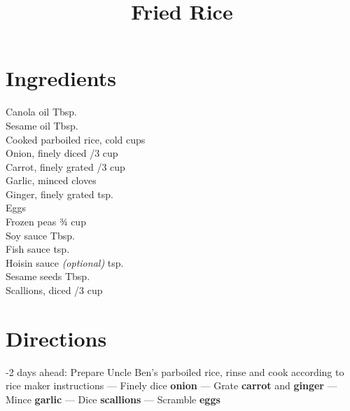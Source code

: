 \documentclass[11pt,letterpaper]{article}
\title{Fried Rice}
\author{}
\date{}
\begin{document}
\maketitle
\thispagestyle{empty}

\section*{Ingredients}
\setlength{\columnsep}{20pt}
\begin{multicols}{2}
\noindent
    Canola oil  Tbsp. \\
    Sesame oil  Tbsp. \\
    Cooked parboiled rice,  cold  cups \\
    Onion, finely diced /3 cup \\
    Carrot, finely grated /3 cup \\
    Garlic, minced  cloves \\
    Ginger, finely grated  tsp. \\
    Eggs  \\
    \columnbreak
    Frozen peas \dotfill ¾ cup \\
    Soy sauce  Tbsp. \\
    Fish sauce  tsp. \\
    Hoisin sauce \textit{(optional)}  tsp. \\
    Sesame seeds  Tbsp. \\
    Scallions, diced /3 cup \\
\end{multicols}

\section*{Directions}

-2 days ahead: Prepare Uncle Ben's parboiled rice, rinse and cook according to rice maker instructions ---
Finely dice \textbf{onion} ---
Grate \textbf{carrot} and \textbf{ginger} ---
Mince \textbf{garlic} ---
Dice \textbf{scallions} ---
Scramble \textbf{eggs}
\end{document}
